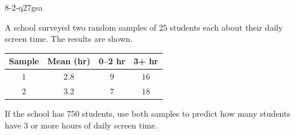 \begin{practiceQuestion}{8-2-q27}{gsa}
\begin{questionText}
A school surveyed two random samples of $25$ students each about their daily screen time. The results are shown.

\begin{center}
\begin{tabular}{|c|c|c|c|}
\hline
\textbf{Sample} & \textbf{Mean (hr)} & \textbf{0--2 hr} & \textbf{3+ hr} \\
\hline
$1$ & $2.8$ & $9$ & $16$ \\
$2$ & $3.2$ & $7$ & $18$ \\
\hline
\end{tabular}
\end{center}

If the school has $750$ students, use both samples to predict how many students have $3$ or more hours of daily screen time.
\end{questionText}
\end{practiceQuestion}
